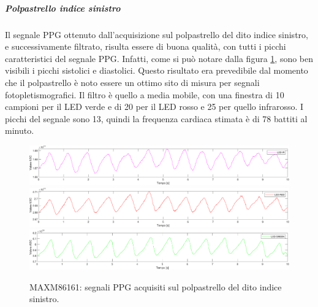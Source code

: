 \subparagraph{Polpastrello indice sinistro}
Il segnale PPG ottenuto dall'acquisizione sul polpastrello del dito indice sinistro, e successivamente filtrato, risulta essere di buona qualità, con tutti i picchi caratteristici del segnale PPG. Infatti, come si può notare dalla figura \ref{fig:soggetto2_MAXM86161_polpastrello}, sono ben visibili i picchi sistolici e diastolici. Questo risultato era prevedibile dal momento che il polpastrello è noto essere un ottimo sito di misura per segnali fotopletismografici. Il filtro è quello a media mobile, con una finestra di 10 campioni per il LED verde e di 20 per il LED rosso e 25 per quello infrarosso. I picchi del segnale sono 13, quindi la frequenza cardiaca stimata è di 78 battiti al minuto.
\begin{figure}[h]
	\centering
	\includegraphics[width=1\linewidth]{ImageFiles/Misure Preliminari/Soggetto 2/maxm86161/polpastrello_ir_moving_avg}
	\includegraphics[width=1\linewidth]{ImageFiles/Misure Preliminari/Soggetto 2/maxm86161/polpastrello_red_moving_avg}
	\includegraphics[width=1\linewidth]{ImageFiles/Misure Preliminari/Soggetto 2/maxm86161/polpastrello_green_moving_avg}
	\caption{MAXM86161: segnali PPG acquisiti sul polpastrello del dito indice sinistro.}
	\label{fig:soggetto2_MAXM86161_polpastrello}
\end{figure}
\clearpage
